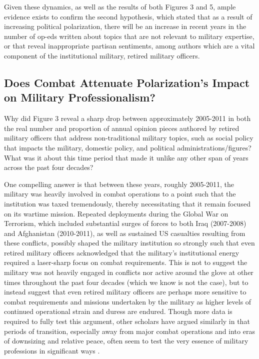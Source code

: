 \documentclass[12pt,]{article}
\begin{document}
Given these dynamics, as well as the results of both Figures 3 and 5, ample evidence exists to confirm the second hypothesis, which stated that as a result of increasing political polarization, there will be an increase in recent years in the number of op-eds written about topics that are not relevant to military expertise, or that reveal inappropriate partisan sentiments, among authors which are a vital component of the institutional military, retired military officers.

\hypertarget{does-combat-attenuate-polarizations-impact-on-military-professionalism}{%
\subsection{Does Combat Attenuate Polarization's Impact on Military Professionalism?}\label{does-combat-attenuate-polarizations-impact-on-military-professionalism}}

Why did Figure 3 reveal a sharp drop between approximately 2005-2011 in both the real number and proportion of annual opinion pieces authored by retired military officers that address non-traditional military topics, such as social policy that impacts the military, domestic policy, and political administrations/figures? What was it about this time period that made it unlike any other span of years across the past four decades?

One compelling answer is that between these years, roughly 2005-2011, the military was heavily involved in combat operations to a point such that the institution was taxed tremendously, thereby necessitating that it remain focused on its wartime mission. Repeated deployments during the Global War on Terrorism, which included substantial surges of forces to both Iraq (2007-2008) and Afghanistan (2010-2011), as well as sustained US casualties resulting from these conflicts, possibly shaped the military institution so strongly such that even retired military officers acknowledged that the military's institutional energy required a laser-sharp focus on combat requirements. This is not to suggest the military was not heavily engaged in conflicts nor active around the glove at other times throughout the past four decades (which we know is not the case), but to instead suggest that even retired military officers are perhaps more sensitive to combat requirements and missions undertaken by the military as higher levels of continued operational strain and duress are endured. Though more data is required to fully test this argument, other scholars have argued similarly in that periods of transition, especially away from major combat operations and into eras of downsizing and relative peace, often seem to test the very essence of military professions in significant ways \autocite{snider_once_2012}.
\end{document}
